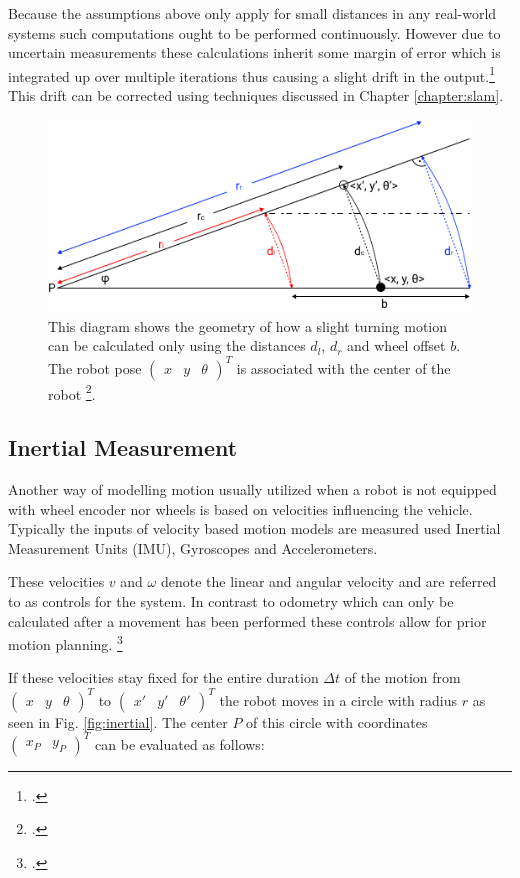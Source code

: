 Because the assumptions above only apply for small distances in any real-world systems such computations ought to be performed continuously. However due to uncertain measurements these calculations inherit some margin of error which is integrated up over multiple iterations thus causing a slight drift in the output.\footcite[Pages 69 - 77]{ben2017elements} 
This drift can be corrected using techniques discussed in Chapter \ref{chapter:slam}.

\begin{figure}
	\centering
	\includegraphics[width=0.8\linewidth]{img/odom}
	\caption{
		This diagram shows the geometry of how a slight turning motion can be calculated only using the distances $d_{l}$, $d_{r}$ and wheel offset $b$.
		The robot pose 
		$
			\begin{pmatrix}
				x &
				y &
				\theta 
			\end{pmatrix}^{T}
		$
		is associated with the center of the robot \footcite{ben2017elements}.
	}
	\label{fig:odom}
\end{figure}


\subsection{Inertial Measurement}
Another way of modelling motion usually utilized when a robot is not equipped with wheel encoder nor wheels is based on velocities influencing the vehicle. Typically the inputs of velocity based motion models are measured used Inertial Measurement Units (IMU), Gyroscopes and Accelerometers. 

These velocities $v$ and $\omega$ denote the linear and angular velocity and are referred to as controls for the system. 
In contrast to odometry which can only be calculated after a movement has been performed these controls allow for prior motion planning. \footcite[Pages 92 - 99]{thrun2002probabilisticRobotics}

If these velocities stay fixed for the entire duration $\Delta t$ of the motion from 
$\begin{pmatrix} x & y & \theta \end{pmatrix}^{T}$
to
$\begin{pmatrix} x' & y' & \theta' \end{pmatrix}^{T}$
the robot moves in a circle with radius $r$ as seen in Fig. \ref{fig:inertial}. The center $P$ of this circle with coordinates 
$
\begin{pmatrix}
	x_{P} & y_{P}
\end{pmatrix}
^{T}
$
can be evaluated as follows:

